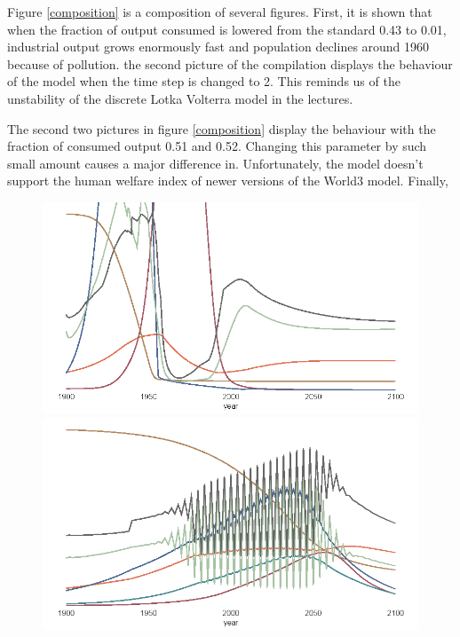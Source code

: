 \documentclass[10pt,a4paper]{scrartcl}
\begin{document}
Figure \ref{composition} is a composition of several figures. First, it is shown that when the fraction of output consumed is lowered from the standard 0.43 to 0.01, industrial output grows enormously fast and population declines around 1960 because of pollution. the second picture of the compilation displays the behaviour of the model when the time step is changed to 2. This reminds us of the unstability of the discrete Lotka Volterra model in the lectures.

The second two pictures in figure \ref{composition} display the behaviour with the fraction of consumed output 0.51 and 0.52. Changing this parameter by such small amount causes a major difference in. Unfortunately, the model doesn't support the human welfare index of newer versions of the World3 model. Finally, 

\begin{figure}
\centering
\begin{minipage}{0.49\textwidth}
\includegraphics[width=\textwidth]{./plaatjes/output-consumed-0,01.png}
\end{minipage}
\begin{minipage}{0.49\textwidth}
\includegraphics[width=\textwidth]{./plaatjes/timestep-2.png}

\end{minipage}
\end{figure}
\end{document}
